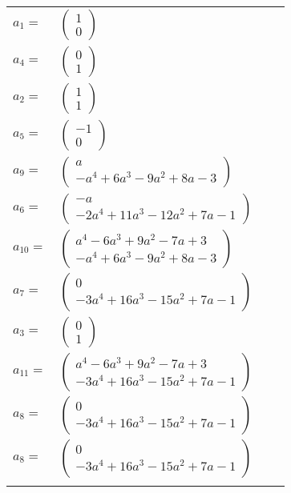 \documentclass[1p]{elsarticle_modified}
\theoremstyle{definition}
\begin{document}
\begin{tabular}{m{7pt} m{180pt} m{7pt} m{180pt} }
\flushright $a_{1}=$&$\begin{pmatrix}1\\0\end{pmatrix}$ \\
\flushright $a_{4}=$&$\begin{pmatrix}0\\1\end{pmatrix}$ \\
\flushright $a_{2}=$&$\begin{pmatrix}1\\1\end{pmatrix}$ \\
\flushright $a_{5}=$&$\begin{pmatrix}-1\\0\end{pmatrix}$ \\
\flushright $a_{9}=$&$\begin{pmatrix}a\\- a^4+6 a^3-9 a^2+8 a-3\end{pmatrix}$ \\
\flushright $a_{6}=$&$\begin{pmatrix}- a\\-2 a^4+11 a^3-12 a^2+7 a-1\end{pmatrix}$ \\
\flushright $a_{10}=$&$\begin{pmatrix}a^4-6 a^3+9 a^2-7 a+3\\- a^4+6 a^3-9 a^2+8 a-3\end{pmatrix}$ \\
\flushright $a_{7}=$&$\begin{pmatrix}0\\-3 a^4+16 a^3-15 a^2+7 a-1\end{pmatrix}$ \\
\flushright $a_{3}=$&$\begin{pmatrix}0\\1\end{pmatrix}$ \\
\flushright $a_{11}=$&$\begin{pmatrix}a^4-6 a^3+9 a^2-7 a+3\\-3 a^4+16 a^3-15 a^2+7 a-1\end{pmatrix}$ \\
\flushright $a_{8}=$&$\begin{pmatrix}0\\-3 a^4+16 a^3-15 a^2+7 a-1\end{pmatrix}$\\ \flushright $a_{8}=$&$\begin{pmatrix}0\\-3 a^4+16 a^3-15 a^2+7 a-1\end{pmatrix}$\\&\end{tabular}
\end{document}
